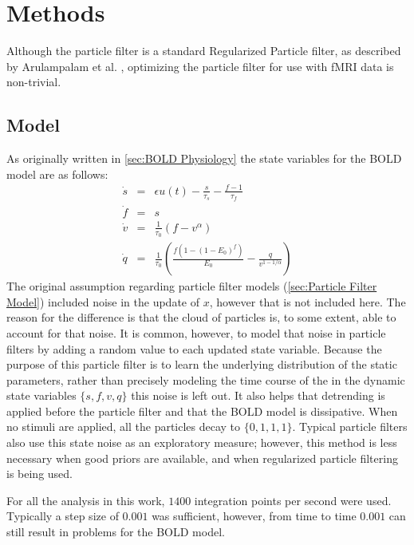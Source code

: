 \chapter{Methods}
\label{sec:Methods}
Although the particle filter  is a standard Regularized
Particle filter, as described by Arulampalam et al.
 \cite{Arulampalam2002a}, optimizing the
particle filter for use with \ac{fMRI} data is non-trivial.


\section{Model}
As originally written in \autoref{sec:BOLD Physiology} the state variables
for the \ac{BOLD} model are as follows:
\begin{eqnarray}
\dot{s} &=& \epsilon u(t) - \frac{s}{\tau_s} - \frac{f - 1}{\tau_f} \\
\dot{f} &=& s\\
\dot{v} &=& \frac{1}{\tau_0}(f - v^\alpha)\\
\dot{q} &=& \frac{1}{\tau_0}(\frac{f(1-(1-E_0)^f)}{E_0} - \frac{q}{v^{1-1/\alpha}})
\end{eqnarray}
The original assumption regarding particle filter models (\autoref{sec:Particle Filter Model})
included noise in the update of $x$, however that is not included here.
The reason for the difference is that the cloud of particles is, to some extent,
able to account for that noise. It is common, however, to model that noise
in particle filters by adding a random value to each updated state variable.
Because the purpose of this particle filter is to learn the underlying distribution
of the static parameters, rather than precisely modeling the time course of the
in the dynamic state variables $\{s,f,v,q\}$ this noise is left out. It also helps
that detrending is applied before the particle filter and that the
\ac{BOLD} model is dissipative. When no stimuli are applied, all the particles
decay to $\{0,1,1,1\}$. Typical particle filters
also use this state noise as an exploratory measure; however, this method is
less necessary when good priors are available, and when regularized particle filtering
is being used.

For all the analysis  in this work, $1400$ integration points
per second were used.  Typically a step size of $0.001$ was sufficient,
however, from time to time $0.001$ can still result in problems for the
\ac{BOLD} model.

